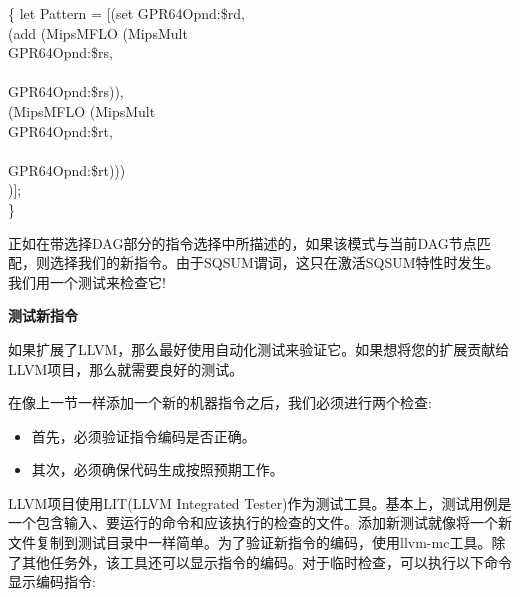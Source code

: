 \begin{tcolorbox}[colback=white,colframe=black]
\{
\hspace*{0.5cm}let Pattern = [(set GPR64Opnd:\$rd, \\
\hspace*{4cm}(add (MipsMFLO (MipsMult \\
\hspace*{4.5cm}GPR64Opnd:\$rs, \\
\\
\hspace*{4.5cm}GPR64Opnd:\$rs)), \\
\hspace*{5.5cm}(MipsMFLO (MipsMult \\
\hspace*{6cm}GPR64Opnd:\$rt, \\
\\
\hspace*{6cm}GPR64Opnd:\$rt))) \\
\hspace*{4.5cm})];\\
\}
\end{tcolorbox}

正如在带选择DAG部分的指令选择中所描述的，如果该模式与当前DAG节点匹配，则选择我们的新指令。由于SQSUM谓词，这只在激活SQSUM特性时发生。我们用一个测试来检查它!\par

\hspace*{\fill} \par %
\textbf{测试新指令}

如果扩展了LLVM，那么最好使用自动化测试来验证它。如果想将您的扩展贡献给LLVM项目，那么就需要良好的测试。\par

在像上一节一样添加一个新的机器指令之后，我们必须进行两个检查:\par

\begin{itemize}
\item 首先，必须验证指令编码是否正确。
\item 其次，必须确保代码生成按照预期工作。
\end{itemize}

LLVM项目使用LIT(LLVM Integrated Tester)作为测试工具。基本上，测试用例是一个包含输入、要运行的命令和应该执行的检查的文件。添加新测试就像将一个新文件复制到测试目录中一样简单。为了验证新指令的编码，使用llvm-mc工具。除了其他任务外，该工具还可以显示指令的编码。对于临时检查，可以执行以下命令显示编码指令:\par

